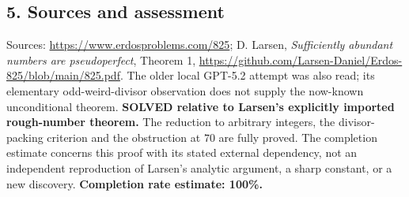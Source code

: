 \subsection*{5. Sources and assessment}
Sources: \url{https://www.erdosproblems.com/825}; D. Larsen, \emph{Sufficiently abundant numbers are pseudoperfect}, Theorem 1, \url{https://github.com/Larsen-Daniel/Erdos-825/blob/main/825.pdf}. The older local GPT-5.2 attempt was also read; its elementary odd-weird-divisor observation does not supply the now-known unconditional theorem.
\textbf{SOLVED relative to Larsen's explicitly imported rough-number theorem.} The reduction to arbitrary integers, the divisor-packing criterion and the obstruction at $70$ are fully proved. The completion estimate concerns this proof with its stated external dependency, not an independent reproduction of Larsen's analytic argument, a sharp constant, or a new discovery.
\textbf{Completion rate estimate: 100\%.}
